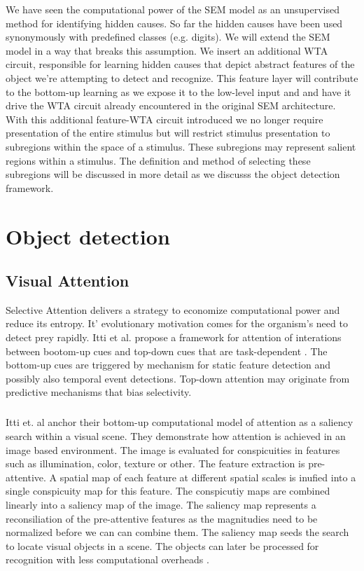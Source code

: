 \documentclass{report}
\begin{document}
We have seen the computational power of the SEM model as an unsupervised method for identifying hidden causes. So far the hidden causes have been used synonymously with predefined classes (e.g. digits\cite{LeCun1998}). We will extend the SEM model in a way that breaks this assumption. We insert an additional WTA circuit, responsible for learning hidden causes that depict abstract features of the object we're attempting to detect and recognize. This feature layer will contribute to the bottom-up learning as we expose it to the low-level input and and have it drive the WTA circuit already encountered in the original SEM architecture. With this additional feature-WTA circuit introduced we no longer require presentation of the entire stimulus but will restrict stimulus presentation to subregions within the space of a stimulus. These subregions may represent salient regions within a stimulus. The definition and method of selecting these subregions will be discussed in more detail as we discusss the object detection framework.

\chapter{Object detection}

\section{Visual Attention}

Selective Attention delivers a strategy to economize computational power and reduce its entropy. It' evolutionary motivation comes for the organism's need to detect prey rapidly. Itti et al. propose a framework for attention of interations between bootom-up cues and top-down cues that are task-dependent \cite{Itti2001}. The bottom-up cues are triggered by mechanism for static feature detection and possibly also temporal event detections. Top-down attention may originate from predictive mechanisms that bias selectivity. 

\paragraph{}Itti et. al anchor their bottom-up computational model of attention as a saliency search within a visual scene. They demonstrate how attention is achieved in an image based environment. The image is evaluated for conspicuities in features such as illumination, color, texture or other. The feature extraction is pre-attentive. A spatial map of each feature at different spatial scales is inufied into a single conspicuity map for this feature. The conspicutiy maps are combined linearly into a saliency map of the image. The saliency map represents a reconsiliation of the pre-attentive features as the magnitudies need to be normalized before we can can combine them. The saliency map seeds the search to locate visual objects in a scene. The objects can later be processed for recognition with less computational overheads \cite{Itti2000, Itti2001}.
\end{document}
